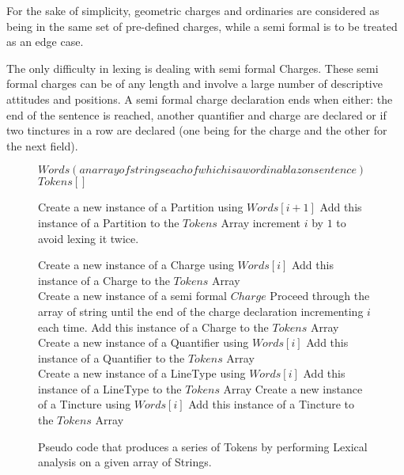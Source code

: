 For the sake of simplicity, geometric charges and ordinaries are considered as being in the same set of pre-defined charges,  while a semi formal is to be treated as an edge case. 

The only difficulty in lexing is dealing with semi formal Charges.  These semi formal charges can be of any length and involve a large number of descriptive attitudes and positions.   A semi formal charge declaration ends when either: the end of the sentence is reached, another quantifier and charge are declared or if two tinctures in a row are declared (one being for the charge and the other for the next field). 

\begin{figure}[H]
\begin{algorithmic}[1]



\STATE $Words (an array of strings each of which is a word in a blazon sentence) $ 
\STATE $Tokens[]$ \\

		\STATE Create a new instance of a Partition using $Words[i+1]$
		\STATE Add this instance of a Partition to the $Tokens$ Array
		\STATE increment $i$ by $1$ to avoid lexing it twice. 

		\STATE Create a new instance of a Charge using $Words[i]$
		\STATE Add this instance of a Charge to the $Tokens$ Array \\

		\STATE Create a new instance of a semi formal $Charge$ 
		\STATE Proceed through the array of string until the end of the charge declaration incrementing $i$ each time.  
		\STATE Add this instance of a Charge to the $Tokens$ Array
		\STATE Create a new instance of a Quantifier using $Words[i]$
		\STATE Add this instance of a Quantifier to the $Tokens$ Array \\

		\STATE Create a new instance of a LineType using $Words[i]$
		\STATE Add this instance of a LineType to the $Tokens$ Array
		\STATE Create a new instance of a Tincture using $Words[i]$
		\STATE Add this instance of a Tincture to the $Tokens$ Array
 	\ENDIF
\ENDFOR



\end{algorithmic}
\caption{Pseudo code that produces a series of Tokens by performing Lexical analysis on a given array of Strings.}
\end{figure}


